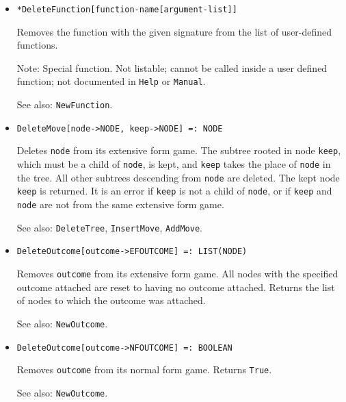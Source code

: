 \begin{itemize}
\item{}
\protect \large \begin{verbatim}
*DeleteFunction[function-name[argument-list]]
\end{verbatim}\normalsize

\bd
Removes the function with the given signature
from the list of user-defined functions.
\item [Note:] Special function. Not listable; cannot be called inside
a user defined function; not documented in \verb+Help+ or \verb+Manual+.  
\item [See also:] \verb+NewFunction+.
\ed

\item{}
\protect \large \begin{verbatim}
DeleteMove[node->NODE, keep->NODE] =: NODE 
\end{verbatim}\normalsize

\bd
Deletes \verb+node+ from its extensive form game.  The
subtree rooted in node \verb+keep+, which must be a child of
\verb+node+, is kept, and \verb+keep+ takes the place of \verb+node+ in
the tree.  All other subtrees descending from \verb+node+ are deleted.
The kept node \verb+keep+ is returned.  It is an error if \verb+keep+
is not a child of \verb+node+, or if \verb+keep+ and \verb+node+ are not
from the same extensive form game.
\item [See also:] \verb+DeleteTree+, \verb+InsertMove+, \verb+AddMove+.
\ed

\item{}
\protect \large \begin{verbatim}
DeleteOutcome[outcome->EFOUTCOME] =: LIST(NODE) 
\end{verbatim}\normalsize

\bd
Removes \verb+outcome+ from its extensive
form game.  All nodes with the specified outcome attached are reset to
having no outcome attached.  Returns the list of nodes to which
the outcome was attached.
\item [See also:] \verb+NewOutcome+.
\ed

\item{}
\protect \large \begin{verbatim}
DeleteOutcome[outcome->NFOUTCOME] =: BOOLEAN 
\end{verbatim}\normalsize

\bd
Removes \verb+outcome+ from its normal form game.  Returns \verb+True+.
\item [See also:] \verb+NewOutcome+.
\ed



\end{itemize}
